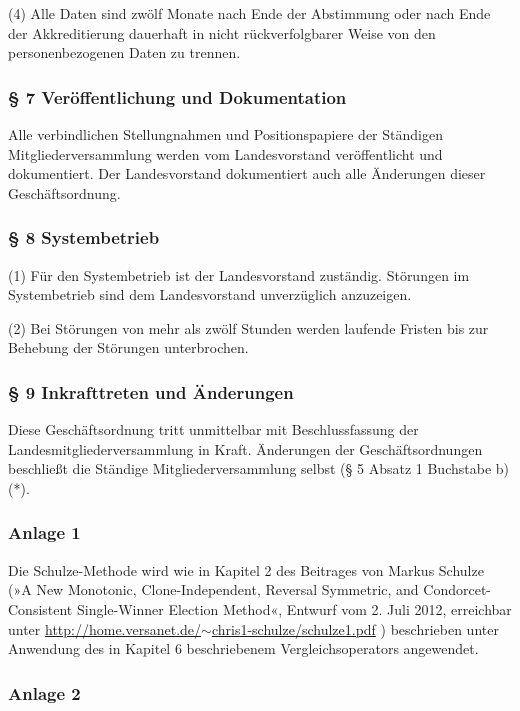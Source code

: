 (4) Alle Daten sind zwölf Monate nach Ende der Abstimmung oder nach Ende der Akkreditierung dauerhaft in nicht rückverfolgbarer Weise von den personenbezogenen Daten zu trennen.

\subsubsection{§ 7 Veröffentlichung und Dokumentation}

Alle verbindlichen Stellungnahmen und Positionspapiere der Ständigen Mitgliederversammlung werden vom Landesvorstand veröffentlicht und dokumentiert. Der Landesvorstand dokumentiert auch alle Änderungen dieser Geschäftsordnung.

\subsubsection{§ 8 Systembetrieb}

(1) Für den Systembetrieb ist der Landesvorstand zuständig. Störungen im Systembetrieb sind dem Landesvorstand unverzüglich anzuzeigen.

(2) Bei Störungen von mehr als zwölf Stunden werden laufende Fristen bis zur Behebung der Störungen unterbrochen.

\subsubsection{§ 9 Inkrafttreten und Änderungen}

Diese Geschäftsordnung tritt unmittelbar mit Beschlussfassung der Landesmitgliederversammlung in Kraft. Änderungen der Geschäftsordnungen beschließt die Ständige Mitgliederversammlung selbst (§ 5 Absatz 1 Buchstabe b) (*).

\subsubsection{Anlage 1}

Die Schulze-Methode wird wie in Kapitel 2 des Beitrages von Markus Schulze (»A New Monotonic, Clone-Independent, Reversal Symmetric, and Condorcet-Consistent Single-Winner Election Method«, Entwurf vom 2. Juli 2012, erreichbar unter \href{http://home.versanet.de/\ensuremath{\sim}chris1-schulze/schulze1.pdf}{http://home.versanet.de/\ensuremath{\sim}chris1-schulze/schulze1.pdf} ) beschrieben unter Anwendung des in Kapitel 6 beschriebenem Vergleichsoperators angewendet.

\subsubsection{Anlage 2}

